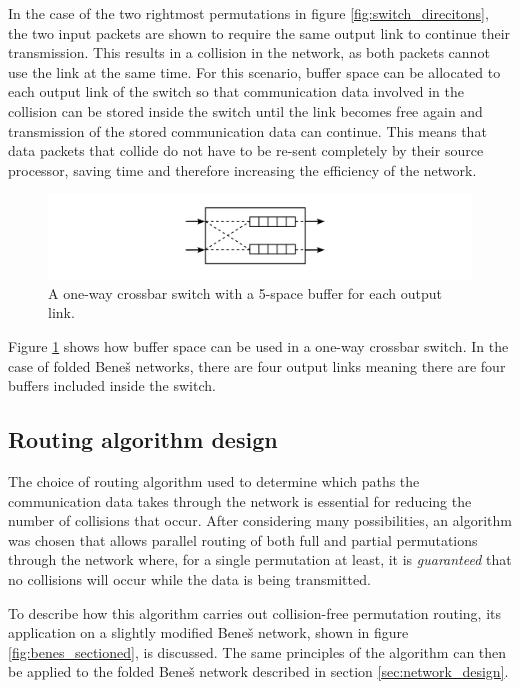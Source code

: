 \documentclass[a4paper, 12pt]{article}
\begin{document}
In the case of the two rightmost permutations in figure \ref{fig:switch_direcitons}, the two input packets are shown to require the same output link to continue their transmission. This results in a collision in the network, as both packets cannot use the link at the same time. For this scenario, buffer space can be allocated to each output link of the switch so that communication data involved in the collision can be stored inside the switch until the link becomes free again and transmission of the stored communication data can continue. This means that data packets that collide do not have to be re-sent completely by their source processor, saving time and therefore increasing the efficiency of the network.

\begin{figure}[H]
\centering
\includegraphics[width=\textwidth]{switch_buffer.png}
\caption[A one-way crossbar switch with a 5-space buffer for each output link]{A one-way crossbar switch with a 5-space buffer for each output link.}
\label{fig:switch_buffer}
\end{figure}

Figure \ref{fig:switch_buffer} shows how buffer space can be used in a one-way crossbar switch. In the case of folded Bene\v{s} networks, there are four output links meaning there are four buffers included inside the switch.

\subsection{Routing algorithm design}
\label{sec:routing_design}

The choice of routing algorithm used to determine which paths the communication data takes through the network is essential for reducing the number of collisions that occur. After considering many possibilities, an algorithm was chosen that allows parallel routing of both full and partial permutations through the network where, for a single permutation at least, it is \textit{guaranteed} that no collisions will occur while the data is being transmitted. 

To describe how this algorithm carries out collision-free permutation routing, its application on a slightly modified Bene\v{s} network, shown in figure \ref{fig:benes_sectioned}, is discussed. The same principles of the algorithm can then be applied to the folded Bene\v{s} network described in section \ref{sec:network_design}.
\end{document}
